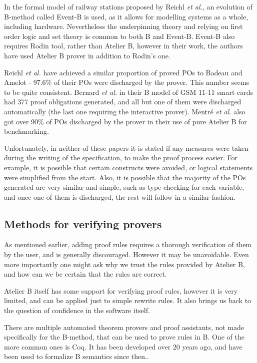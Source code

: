 \documentclass[11pt,journal]{IEEEtran}
\begin{document}
	In the formal model of railway stations proposed by Reichl \emph{et al.}\cite{Railway routing}, an evolution of B-method called Event-B is used, as it allows for modelling systems as a whole, including hardware. Nevertheless the underpinning theory and relying on first order logic and set theory is common to both B and Event-B. Event-B also requires Rodin tool, rather than Atelier B, however in their work, the authors have used Atelier B prover in addition to Rodin's one.
	
	Reichl \emph{et al.} have achieved a similar proportion of proved POs to Badeau and Amelot - 97.6\% of their POs were discharged  by the prover. This number seems to be quite consistent. Bernard \emph{et al.} in their B model of GSM 11-11 smart cards had 377 proof obligations generated, and all but one of them were discharged automatically (the last one requiring the interactive prover)\cite{GSM}. Mentr\'{e} \emph{et al.} also got over 90\% of POs discharged by the prover in their use of pure Atelier B for benchmarking.\cite{discharging}
	
	Unfortunately, in neither of these papers it is stated if any measures were taken during the writing of the specification, to make the proof process easier. For example, it is possible that certain constructs were avoided, or logical statements were simplified from the start. Also, it is possible that the majority of the POs generated are very similar and simple, such as type checking for each variable, and once one of them is discharged, the rest will follow in a similar fashion.
	
	
	\subsection{Methods for verifying provers}
	
	As mentioned earlier, adding proof rules requires a thorough verification of them by the user, and is generally discouraged. However it may be unavoidable. Even more importantly one might ask why we trust the rules provided by Atelier B, and how can we be certain that the rules are correct.
	
	Atelier B itself has some support for verifying proof rules, however it is very limited, and can be applied just to simple rewrite rules. It also brings us back to the question of confidence in the software itself.
	
	There are multiple automated theorem provers and proof assistants, not made specifically for the B-method, that can be used to prove rules in B. One of the more common ones is Coq. It has been developed over 20 years ago, and have been used to formalize B semantics since then.\cite{Coq and PVS}.
	
\end{document}
